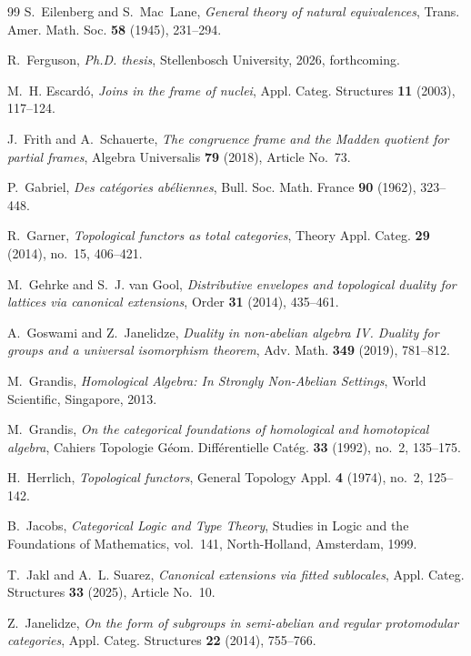 \documentclass[12pt,oneside,reqno]{amsart}
\theoremstyle{definition}
\theoremstyle{remark}
\begin{document}
\begin{thebibliography}{99}
S.~Eilenberg and S.~Mac~Lane,
\emph{General theory of natural equivalences},
Trans. Amer. Math. Soc. \textbf{58} (1945), 231--294.

R.~Ferguson,
\emph{Ph.D. thesis},
Stellenbosch University, 2026, forthcoming.

M.~H. Escard\'{o},
\emph{Joins in the frame of nuclei},
Appl. Categ. Structures \textbf{11} (2003), 117--124.

J.~Frith and A.~Schauerte,
\emph{The congruence frame and the Madden quotient for partial frames},
Algebra Universalis \textbf{79} (2018), Article No.~73.

P.~Gabriel,
\emph{Des cat\'egories ab\'eliennes},
Bull. Soc. Math. France \textbf{90} (1962), 323--448.

R.~Garner,
\emph{Topological functors as total categories},
Theory Appl. Categ. \textbf{29} (2014), no.~15, 406--421.

M.~Gehrke and S.~J. van Gool,
\emph{Distributive envelopes and topological duality for lattices via
canonical extensions},
Order \textbf{31} (2014), 435--461.

A.~Goswami and Z.~Janelidze,
\emph{Duality in non-abelian algebra IV. Duality for groups and a
universal isomorphism theorem},
Adv. Math. \textbf{349} (2019), 781--812.

M.~Grandis,
\emph{Homological Algebra: In Strongly Non-Abelian Settings},
World Scientific, Singapore, 2013.

M.~Grandis,
\emph{On the categorical foundations of homological and homotopical
algebra},
Cahiers Topologie G\'eom. Diff\'erentielle Cat\'eg.
\textbf{33} (1992), no.~2, 135--175.

H.~Herrlich,
\emph{Topological functors},
General Topology Appl. \textbf{4} (1974), no.~2, 125--142.

B.~Jacobs,
\emph{Categorical Logic and Type Theory},
Studies in Logic and the Foundations of Mathematics, vol.~141,
North-Holland, Amsterdam, 1999.

T.~Jakl and A.~L. Suarez,
\emph{Canonical extensions via fitted sublocales},
Appl. Categ. Structures \textbf{33} (2025), Article No.~10.

Z.~Janelidze,
\emph{On the form of subgroups in semi-abelian and regular
protomodular categories},
Appl. Categ. Structures \textbf{22} (2014), 755--766.


\end{thebibliography}
\end{document}

